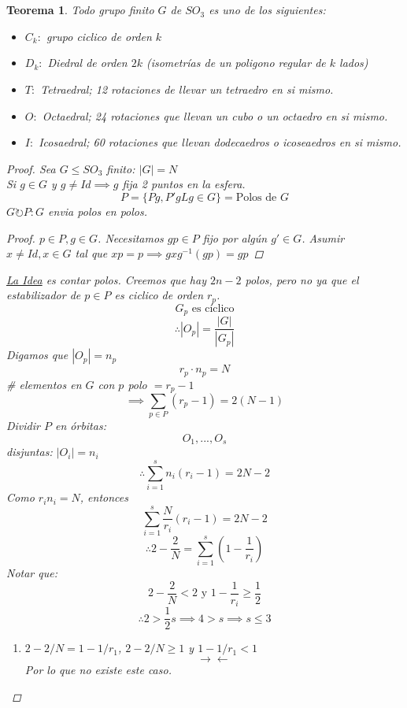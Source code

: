 \documentclass[11pt]{book}
\newcommand{\contr}{\rightarrow\leftarrow}
\newtheorem{thm}{Teorema}[section]
\theoremstyle{definition}
\begin{document}
\section{}
\begin{thm}
	Todo grupo finito $G$ de $SO_3$ es uno de los siguientes:
	\begin{itemize}
		\item $C_k:$ grupo ciclico de orden $k$

		\item $D_k:$ Diedral de orden $2k$ (isometrías de un poligono regular de $k$ lados)

		\item $T:$ Tetraedral; 12 rotaciones de llevar un tetraedro en si mismo.

		\item $O:$ Octaedral; 24 rotaciones que llevan un cubo o un octaedro en si mismo.

		\item $I:$ Icosaedral; 60 rotaciones que llevan dodecaedros o icoseaedros en si mismo.
	\end{itemize}
	\begin{proof}
		Sea $G\leq SO_3$ finito: $|G|=N$\\
		Si $g\in G$ y $g\neq Id\implies g$ fija 2 puntos en la esfera.
		\[P=\{Pg,P'gLg\in G\}=\textrm{Polos de $G$}\]
		$G\circlearrowright P:G$ envia polos en polos.
		\begin{proof}
			$p\in P, g\in G$. Necesitamos $gp\in P$ fijo por algún $g'\in G$. Asumir $x\neq Id, x\in G$ tal que $xp=p\implies gxg^{-1}(gp)=gp$
		\end{proof}
		\underline{La Idea} es contar polos. 
		Creemos que hay $2n-2$ polos, pero no ya que el estabilizador de $p\in P$ es ciclico de orden $r_p$.
		\[G_p\textrm{ es cíclico}\]
		\[\therefore |O_p|=\frac{|G|}{|G_p|}\]
		Digamos que $|O_p| = n_p$
		\[r_p\cdot n_p=N\]
		\# elementos en $G$ con $p$ polo $=r_p-1$
		\[\implies\sum_{p\in P}(r_p-1)=2(N-1)\]
		Dividir $P$ en órbitas:
		\[O_1,...,O_s\]
		disjuntas: $|O_i|=n_i$
		\[\therefore\sum^s_{i=1}n_i(r_i-1)=2N-2\]
		Como $r_in_i=N$, entonces
		\[\sum^s_{i=1}\frac{N}{r_i}(r_i-1)=2N-2\]
		\[\therefore 2-\frac{2}{N}=\sum^s_{i=1}\left(1-\frac{1}{r_i}\right)\]
		Notar que:
		\[2-\frac{2}{N}<2\textrm{ y }1-\frac{1}{r_i}\geq \frac{1}{2}\]
		\[\therefore 2>\frac{1}{2}s\implies 4>s\implies s\leq 3\]
		\begin{enumerate}[label=(\arabic* órbitas):]
			\item $2-2/N=1-1/r_1$, $2-2/N\geq 1$ y $1-1/r_1<1$
			\[\contr\]
			Por lo que no existe este caso.
			

\end{enumerate}
\end{proof}
\end{thm}
\end{document}
